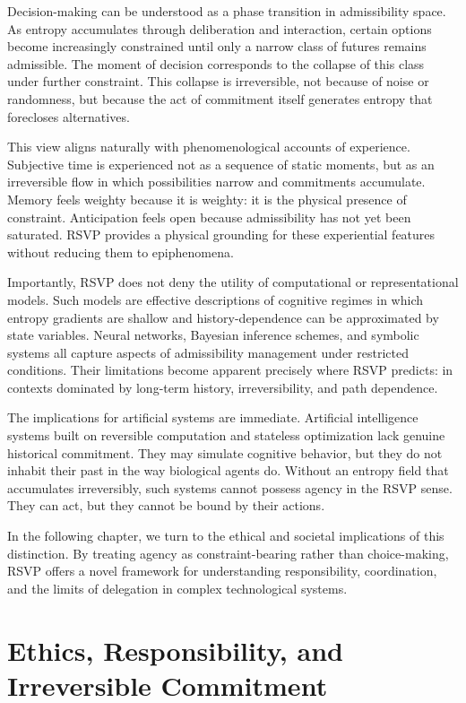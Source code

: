 \documentclass[11pt,oneside]{book}
\begin{document}
Decision-making can be understood as a phase transition in admissibility space. As entropy accumulates through deliberation and interaction, certain options become increasingly constrained until only a narrow class of futures remains admissible. The moment of decision corresponds to the collapse of this class under further constraint. This collapse is irreversible, not because of noise or randomness, but because the act of commitment itself generates entropy that forecloses alternatives.

This view aligns naturally with phenomenological accounts of experience. Subjective time is experienced not as a sequence of static moments, but as an irreversible flow in which possibilities narrow and commitments accumulate. Memory feels weighty because it is weighty: it is the physical presence of constraint. Anticipation feels open because admissibility has not yet been saturated. RSVP provides a physical grounding for these experiential features without reducing them to epiphenomena.

Importantly, RSVP does not deny the utility of computational or representational models. Such models are effective descriptions of cognitive regimes in which entropy gradients are shallow and history-dependence can be approximated by state variables. Neural networks, Bayesian inference schemes, and symbolic systems all capture aspects of admissibility management under restricted conditions. Their limitations become apparent precisely where RSVP predicts: in contexts dominated by long-term history, irreversibility, and path dependence.

The implications for artificial systems are immediate. Artificial intelligence systems built on reversible computation and stateless optimization lack genuine historical commitment. They may simulate cognitive behavior, but they do not inhabit their past in the way biological agents do. Without an entropy field that accumulates irreversibly, such systems cannot possess agency in the RSVP sense. They can act, but they cannot be bound by their actions.

In the following chapter, we turn to the ethical and societal implications of this distinction. By treating agency as constraint-bearing rather than choice-making, RSVP offers a novel framework for understanding responsibility, coordination, and the limits of delegation in complex technological systems.

\chapter{Ethics, Responsibility, and Irreversible Commitment}
\end{document}
